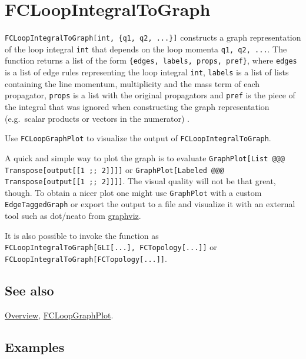 \documentclass[../FeynCalcManual.tex]{subfiles}
\begin{document}
\hypertarget{fcloopintegraltograph}{
\section{FCLoopIntegralToGraph}\label{fcloopintegraltograph}}

\texttt{FCLoopIntegralToGraph[\allowbreak{}int,\ \allowbreak{}\{\allowbreak{}q1,\ \allowbreak{}q2,\ \allowbreak{}...\}]}
constructs a graph representation of the loop integral \texttt{int} that
depends on the loop momenta
\texttt{q1,\ \allowbreak{}q2,\ \allowbreak{}...}. The function returns a
list of the form
\texttt{\{\allowbreak{}edges,\ \allowbreak{}labels,\ \allowbreak{}props,\ \allowbreak{}pref\}},
where \texttt{edges} is a list of edge rules representing the loop
integral \texttt{int}, \texttt{labels} is a list of lists containing the
line momentum, multiplicity and the mass term of each propagator,
\texttt{props} is a list with the original propagators and \texttt{pref}
is the piece of the integral that was ignored when constructing the
graph representation (e.g.~scalar products or vectors in the numerator)
.

Use \texttt{FCLoopGraphPlot} to visualize the output of
\texttt{FCLoopIntegralToGraph}.

A quick and simple way to plot the graph is to evaluate
\texttt{GraphPlot[\allowbreak{}List @@@ Transpose[\allowbreak{}output[\allowbreak{}[\allowbreak{}1 ;; 2]]]]}
or
\texttt{GraphPlot[\allowbreak{}Labeled @@@ Transpose[\allowbreak{}output[\allowbreak{}[\allowbreak{}1 ;; 2]]]]}.
The visual quality will not be that great, though. To obtain a nicer
plot one might use \texttt{GraphPlot} with a custom
\texttt{EdgeTaggedGraph} or export the output to a file and visualize it
with an external tool such as dot/neato from
\href{https://graphviz.org/}{graphviz}.

It is also possible to invoke the function as
\texttt{FCLoopIntegralToGraph[\allowbreak{}GLI[\allowbreak{}...],\ \allowbreak{}FCTopology[\allowbreak{}...]]}
or
\texttt{FCLoopIntegralToGraph[\allowbreak{}FCTopology[\allowbreak{}...]]}.

\subsection{See also}

\hyperlink{toc}{Overview}, \hyperlink{fcloopgraphplot}{FCLoopGraphPlot}.

\subsection{Examples}
\end{document}
